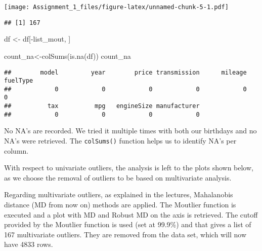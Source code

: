 \documentclass[
]{article}
\newenvironment{Shaded}{\begin{snugshade}}{\end{snugshade}}
\newcommand{\FunctionTok}[1]{\textcolor[rgb]{0.00,0.00,0.00}{#1}}
\newcommand{\NormalTok}[1]{#1}
\newcommand{\OtherTok}[1]{\textcolor[rgb]{0.56,0.35,0.01}{#1}}
\newcommand{\SpecialCharTok}[1]{\textcolor[rgb]{0.00,0.00,0.00}{#1}}
\begin{document}
\texttt{[image: Assignment\_1\_files/figure-latex/unnamed-chunk-5-1.pdf]}

\begin{Shaded}
\end{Shaded}

\begin{verbatim}
## [1] 167
\end{verbatim}

\begin{Shaded}
\begin{Highlighting}[]
\NormalTok{df }\OtherTok{\textless{}{-}}\NormalTok{ df[}\SpecialCharTok{{-}}\NormalTok{list\_mout, ]}


\NormalTok{count\_na}\OtherTok{\textless{}{-}}\FunctionTok{colSums}\NormalTok{(}\FunctionTok{is.na}\NormalTok{(df))}
\NormalTok{count\_na}
\end{Highlighting}
\end{Shaded}

\begin{verbatim}
##        model         year        price transmission      mileage     fuelType 
##            0            0            0            0            0            0 
##          tax          mpg   engineSize manufacturer 
##            0            0            0            0
\end{verbatim}

No NA's are recorded. We tried it multiple times with both our birthdays
and no NA's were retrieved. The \texttt{colSums()} function helps us to
identify NA's per column.

With respect to univariate outliers, the analysis is left to the plots
shown below, as we choose the removal of outliers to be based on
multivariate analysis.

Regarding multivariate outliers, as explained in the lectures,
Mahalanobis distance (MD from now on) methods are applied. The Moutlier
function is executed and a plot with MD and Robust MD on the axis is
retrieved. The cutoff provided by the Moutlier function is used (set at
99.9\%) and that gives a list of 167 multivariate outliers. They are
removed from the data set, which will now have 4833 rows.
\end{document}

